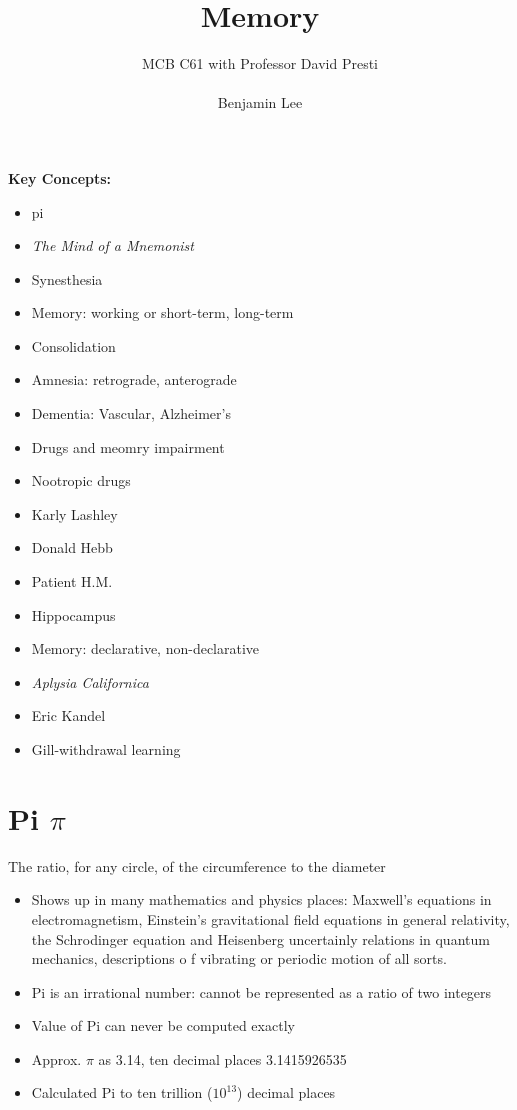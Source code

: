 \documentclass{article}
\title{Memory}
\author{MCB C61 with Professor David Presti \\ \\ Benjamin Lee}
\begin{document}
\maketitle

\textbf{Key Concepts:}
\begin{itemize}
    \item pi
    \item \textit{The Mind of a Mnemonist}
    \item Synesthesia
    \item Memory: working or short-term, long-term
    \item Consolidation
    \item Amnesia: retrograde, anterograde
    \item Dementia: Vascular, Alzheimer's
    \item Drugs and meomry impairment
    \item Nootropic drugs
    \item Karly Lashley
    \item Donald Hebb
    \item Patient H.M.
    \item Hippocampus
    \item Memory: declarative, non-declarative
    \item \textit{Aplysia Californica}
    \item Eric Kandel
    \item Gill-withdrawal learning
\end{itemize}

\newpage
\section{Pi $\pi$}
The ratio, for any circle, of the circumference to the diameter 
\begin{itemize}
    \item Shows up in many mathematics and physics places: Maxwell's equations in electromagnetism, Einstein's gravitational field equations in general relativity, the Schrodinger equation and Heisenberg uncertainly relations in quantum mechanics, descriptions o f vibrating or periodic motion of all sorts. 
    \item Pi is an irrational number: cannot be represented as a ratio of two integers 
    \item Value of Pi can never be computed exactly
    \item Approx. $\pi$ as 3.14, ten decimal places 3.1415926535
    \item Calculated Pi to ten trillion ($10^{13}$) decimal places
\end{itemize}
\end{document}
